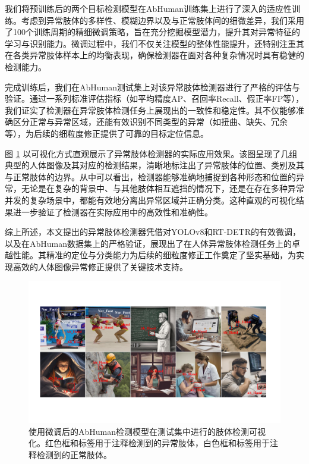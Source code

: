 我们将预训练后的两个目标检测模型在AbHuman训练集上进行了深入的适应性训练。考虑到异常肢体的多样性、模糊边界以及与正常肢体间的细微差异，我们采用了100个训练周期的精细微调策略，旨在充分挖掘模型潜力，提升其对异常特征的学习与识别能力。微调过程中，我们不仅关注模型的整体性能提升，还特别注重其在各类异常肢体样本上的均衡表现，确保检测器在面对各种复杂情况时具有稳健的检测能力。

完成训练后，我们在AbHuman测试集上对该异常肢体检测器进行了严格的评估与验证。通过一系列标准评估指标（如平均精度AP、召回率Recall、假正率FP等），我们证实了检测器在异常肢体检测任务上展现出的一致性和稳定性。其不仅能够准确区分正常与异常区域，还能有效识别不同类型的异常（如扭曲、缺失、冗余等），为后续的细粒度修正提供了可靠的目标定位信息。

图 \ref{fig_detection_example} 以可视化方式直观展示了异常肢体检测器的实际应用效果。该图呈现了几组典型的人体图像及其对应的检测结果，清晰地标注出了异常肢体的位置、类别及其与正常肢体的边界。从中可以看出，检测器能够准确地捕捉到各种形态和位置的异常，无论是在复杂的背景中、与其他肢体相互遮挡的情况下，还是在存在多种异常并发的复杂场景中，都能有效地分离出异常区域并正确分类。这种直观的可视化结果进一步验证了检测器在实际应用中的高效性和准确性。

综上所述，本文提出的异常肢体检测器凭借对YOLOv8和RT-DETR的有效微调，以及在AbHuman数据集上的严格验证，展现出了在人体异常肢体检测任务上的卓越性能。其精准的定位与分类能力为后续的细粒度修正工作奠定了坚实基础，为实现高效的人体图像异常修正提供了关键技术支持。


\begin{figure}[h]
    \centering
    \vspace{-2mm}
    \includegraphics[width=1\columnwidth]{fig/grid_images_resized.pdf}
    \caption{使用微调后的AbHuman检测模型在测试集中进行的肢体检测可视化。红色框和标签用于注释检测到的异常肢体，白色框和标签用于注释检测到的正常肢体。}
    \label{fig_detection_example}
    \vspace{-5mm}
\end{figure}



